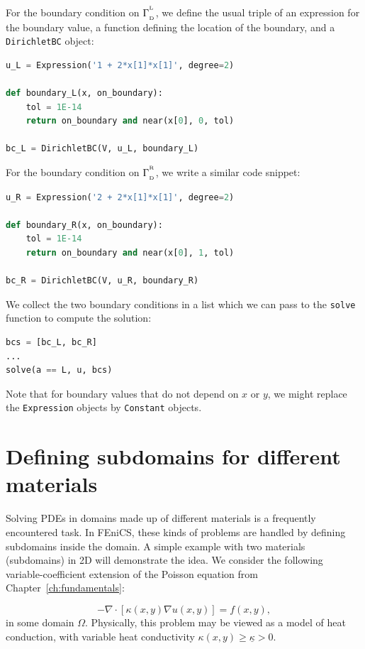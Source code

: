 \documentclass[graybox,envcountchap,sectrefs,final]{svmonodo}
\begin{document}
For the boundary condition on $\Gamma_{_\mathrm{D}}^{^{\mathrm{L}}}$, we define the
usual triple of an expression for the boundary value, a function
defining the location of the boundary, and a \texttt{DirichletBC} object:

\begin{lstlisting}[language=Python,style=graycolor]
u_L = Expression('1 + 2*x[1]*x[1]', degree=2)

def boundary_L(x, on_boundary):
    tol = 1E-14
    return on_boundary and near(x[0], 0, tol)

bc_L = DirichletBC(V, u_L, boundary_L)
\end{lstlisting}
For the boundary condition on $\Gamma_{_\mathrm{D}}^{^{\mathrm{R}}}$, we write a
similar code snippet:

\begin{lstlisting}[language=Python,style=graycolor]
u_R = Expression('2 + 2*x[1]*x[1]', degree=2)

def boundary_R(x, on_boundary):
    tol = 1E-14
    return on_boundary and near(x[0], 1, tol)

bc_R = DirichletBC(V, u_R, boundary_R)
\end{lstlisting}
We collect the two boundary conditions in a list which
we can pass to the \texttt{solve} function to compute the solution:

\begin{lstlisting}[language=Python,style=graycolor]
bcs = [bc_L, bc_R]
...
solve(a == L, u, bcs)
\end{lstlisting}

Note that for boundary values that do not depend on $x$ or $y$, we
might replace the \texttt{Expression} objects by \texttt{Constant} objects.

\section{Defining subdomains for different materials}
\label{ftut:possion:2D:2mat:impl}


Solving PDEs in domains made up of different materials is a frequently
encountered task. In FEniCS, these kinds of problems are handled by
defining subdomains inside the domain. A simple example with two
materials (subdomains) in 2D will demonstrate the idea. We consider
the following variable-coefficient extension of the Poisson equation
from Chapter~\ref{ch:fundamentals}:

\begin{equation} \label{ch:poisson0:2D:2mat:varcoeff2}
  -\nabla \cdot \left\lbrack \kappa(x,y)\nabla u(x,y)\right\rbrack =
  f(x, y),
\end{equation}
in some domain $\Omega$.
Physically, this problem may be viewed as a model of heat conduction,
with variable heat conductivity $\kappa(x, y) \geq
\underline{\kappa} > 0$.
\end{document}
